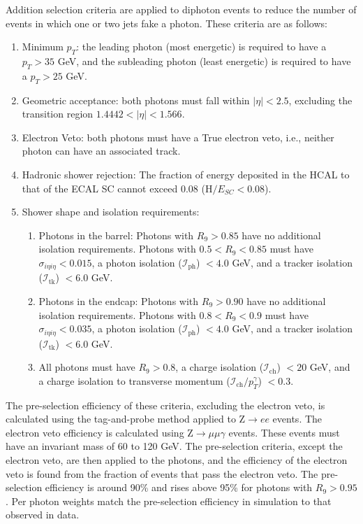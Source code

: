 Addition selection criteria are applied to diphoton events to reduce the number of events in which one or two jets fake a photon. These criteria are as follows:
\begin{enumerate}
    \item Minimum $p_T$: the leading photon (most energetic) is required to have a $p_T > 35$ GeV, and the subleading photon (least energetic) is required to have a $p_T > 25$ GeV.
    \item Geometric acceptance: both photons must fall within $|\eta| < 2.5$, excluding the transition region $1.4442 < |\eta| < 1.566$.
    \item Electron Veto: both photons must have a True electron veto, i.e., neither photon can have an associated track.
    \item Hadronic shower rejection: The fraction of energy deposited in the HCAL to that of the ECAL SC cannot exceed 0.08 (H$/E_{SC} < 0.08$).
    \item Shower shape and isolation requirements: 
    \begin{enumerate}
        \item Photons in the barrel: Photons with $R_9 > 0.85$ have no additional isolation requirements. Photons with $0.5 < R_9 < 0.85$ must have $\sigma_{i\eta i\eta} < 0.015$, a photon isolation ($\mathcal{I}_{\mathrm{ph}}$) $< 4.0$ GeV, and a tracker isolation ($\mathcal{I}_{\mathrm{tk}}$) $< 6.0$ GeV.
        \item Photons in the endcap: Photons with $R_9 > 0.90$ have no additional isolation requirements. Photons with $0.8 < R_9 < 0.9$ must have $\sigma_{i\eta i\eta} < 0.035$, a photon isolation ($\mathcal{I}_{\mathrm{ph}}$) $< 4.0$ GeV, and a tracker isolation ($\mathcal{I}_{\mathrm{tk}}$) $< 6.0$ GeV.
        \item All photons must have $R_9 > 0.8$, a charge isolation ($\mathcal{I}_{\mathrm{ch}}$) $< 20$ GeV, and a charge isolation to transverse momentum ($\mathcal{I}_{\mathrm{ch}}/p_T^{\gamma}$) $< 0.3$.
    \end{enumerate}
\end{enumerate}

The pre-selection efficiency of these criteria, excluding the electron veto, is calculated using the tag-and-probe method applied to Z$\rightarrow ee$ events. The electron veto efficiency is calculated using Z$\rightarrow\mu\mu\gamma$ events. These events must have an invariant mass of 60 to 120 GeV. The pre-selection criteria, except the electron veto, are then applied to the photons, and the efficiency of the electron veto is found from the fraction of events that pass the electron veto. The pre-selection efficiency is around 90\% and rises above 95\% for photons with $R_9 > 0.95$. Per photon weights match the pre-selection efficiency in simulation to that observed in data.


